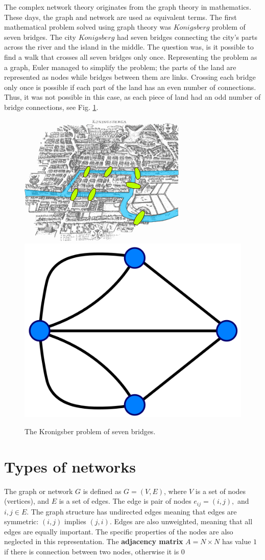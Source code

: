 The complex network theory originates from the graph theory in mathematics. These days, the graph and network are used as equivalent terms. The first mathematical problem solved using graph theory was $Konigsberg$ problem of seven bridges. The city $Konigsberg$ had seven bridges connecting the city's parts across the river and the island in the middle. The question was, is it possible to find a walk that crosses all seven bridges only once. Representing the problem as a graph, Euler managed to simplify the problem; the parts of the land are represented as nodes while bridges between them are links. Crossing each bridge only once is possible if each part of the land has an even number of connections. Thus, it was not possible in this case, as each piece of land had an odd number of bridge connections, see Fig. \ref{fig:Krgraph}.

\begin{figure}[h!]
	\centering
	\includegraphics[width=0.3\linewidth]{Figures/Konigsberg_bridges.png} \hspace{2cm}
	\includegraphics[width=0.3\linewidth]{Figures/Konigsberg_graph.png}
	\caption{The Kronigsber problem of seven bridges.}
	\label{fig:Krgraph}
\end{figure}

\section{Types of networks}

The graph or network $G$ is defined as $G=(V, E)$, where $V$ is a set of nodes (vertices), and $E$ is a set of edges. The edge is pair of nodes $e_{ij} = (i, j), $ and $i,j\in E$. The graph structure has undirected edges meaning that edges are symmetric: $(i, j)$ implies $(j, i)$. Edges are also unweighted, meaning that all edges are equally important. The specific properties of the nodes are also neglected in this representation. The \textbf{adjacency matrix} ${A} = N \times N$ has value $1$ if there is connection between two nodes, otherwise it is $0$ \cite{boccaletti2006}\\

